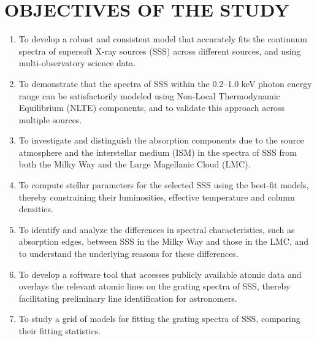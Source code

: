     \section{\MakeUppercase{Objectives of the Study}} \label{introduction:objectives}
    	\begin{enumerate}
    		\item To develop a robust and consistent model that accurately fits the continuum spectra of supersoft X-ray sources (SSS) across different sources, and using multi-observatory science data.
    		
    		\item To demonstrate that the spectra of SSS within the 0.2--1.0 keV photon energy range can be satisfactorily modeled using Non-Local Thermodynamic Equilibrium (NLTE) components, and to validate this approach across multiple sources.
    		
    		\item To investigate and distinguish the absorption components due to the source atmosphere and the interstellar medium (ISM) in the spectra of SSS from both the Milky Way and the Large Magellanic Cloud (LMC).
    		
    		\item To compute stellar parameters for the selected SSS using the best-fit models, thereby constraining their luminosities, effective temperature and column densities.
    		
    		
    		\item To identify and analyze the differences in spectral characteristics, such as absorption edges, between SSS in the Milky Way and those in the LMC, and to understand the underlying reasons for these differences.
    		
    		\item To develop a software tool that accesses publicly available atomic data and overlays the relevant atomic lines on the grating spectra of SSS, thereby facilitating preliminary line identification for astronomers.
    		
    		\item To study a grid of models for fitting the grating spectra of SSS, comparing their fitting statistics.
    	\end{enumerate}
